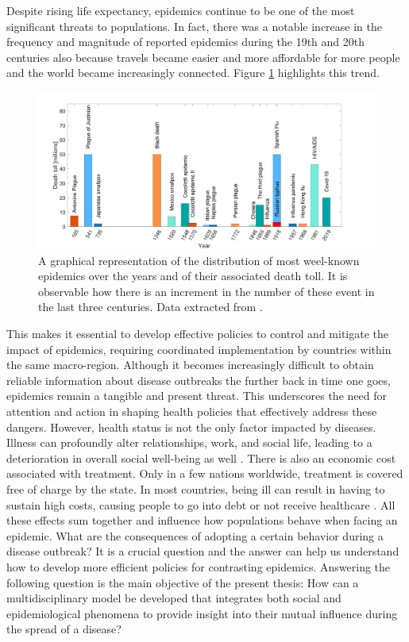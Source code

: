 Despite rising life expectancy, epidemics continue to be one of the most significant threats to populations. In fact, there was a notable increase in the frequency and magnitude of reported epidemics during the 19th and 20th centuries \cite{Anderson_82} also because travels became easier and more affordable for more people and the world became increasingly connected. Figure \ref{fig:worstepidemic} highlights this trend.
\begin{figure}[ht]
	\centering
	\includegraphics[width=0.95\linewidth]{0_introduction/images_introduction/worst_epidemic}
	\caption[Epidemic distribution in time]{A graphical representation of the distribution of most weel-known epidemics over the years and of their associated death toll. It is observable how there is an increment in the number of these event in the last three centuries. Data extracted from \cite{owid_historical_pandemics,wiki_pandemics}.}
	\label{fig:worstepidemic}
\end{figure}

 This makes it essential to develop effective policies to control and mitigate the impact of epidemics, requiring coordinated implementation by countries within the same macro-region. Although it becomes increasingly difficult to obtain reliable information about disease outbreaks the further back in time one goes, epidemics remain a tangible and present threat. This underscores the need for attention and action in shaping health policies that effectively address these dangers.
However, health status is not the only factor impacted by diseases. Illness can profoundly alter relationships, work, and social life, leading to a deterioration in overall social well-being as well \cite{Yang_2020}. 
There is also an economic cost associated with treatment. Only in a few nations worldwide, treatment is covered free of charge by the state. In most countries, being ill can result in having to sustain high costs, causing people to go into debt or not receive healthcare \cite{esteban_2017, Barlow2021}. 
All these effects sum together and influence how populations behave when facing an epidemic. What are the consequences of adopting a certain behavior during a disease outbreak? It is a crucial question and the answer can help us understand how to develop more efficient policies for contrasting epidemics. Answering the following question is the main objective of the present thesis: How can a multidisciplinary model be developed that integrates both social and epidemiological phenomena to provide insight into their mutual influence during the spread of a disease?\\

